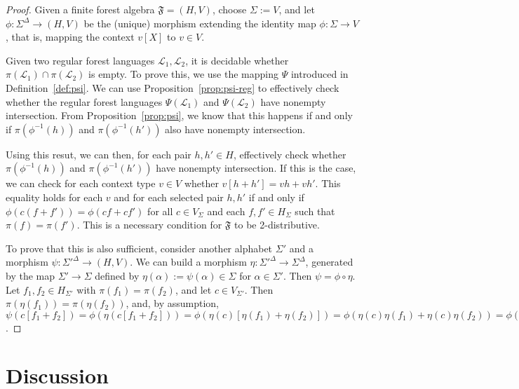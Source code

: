 \documentclass[sigplan,9pt]{acmart}\settopmatter{printfolios=true,printccs=false,printacmref=false}
\theoremstyle{definition}
\newcommand{\La}[0]{{\mathcal{L}}}
\newcommand{\Ff}[0]{{\mathfrak{F}}}
\begin{document}
\begin{proof}
Given a finite forest algebra $\Ff = (H,V)$, choose $\Sigma := V$, and let $\phi : \Sigma^\Delta \rightarrow (H,V)$ be the (unique) morphism extending the identity map $\phi : \Sigma \rightarrow V$, that is, mapping the context $v[X]$ to $v \in V$.

Given two regular forest languages $\La_1, \La_2$, it is decidable whether $\pi(\La_1) \cap \pi(\La_2)$ is empty.
To prove this, we use the mapping $\Psi$ introduced in Definition~\ref{def:psi}.
We can use Proposition~\ref{prop:psi-reg} to effectively check whether the regular forest languages $\Psi(\La_1)$ and $\Psi(\La_2)$ have nonempty intersection.
From Proposition~\ref{prop:psi}, we know that this happens if and only if $\pi(\phi^{-1}(h))$ and $\pi(\phi^{-1}(h'))$ also have nonempty intersection.

Using this resut, we can then, for each pair $h, h' \in H$, effectively check whether $\pi(\phi^{-1}(h))$ and $\pi(\phi^{-1}(h'))$ have nonempty intersection.
If this is the case, we can check for each context type $v \in V$ whether $v[h+h'] = vh+vh'$.
This equality holds for each $v$ and for each selected pair $h, h'$ if and only if $\phi(c(f+f')) = \phi(cf+cf')$ for all $c \in V_\Sigma$ and each $f, f' \in H_\Sigma$ such that $\pi(f) = \pi(f')$.
This is a necessary condition for $\Ff$ to be 2-distributive.


To prove that this is also sufficient, consider another alphabet $\Sigma'$ and a morphism $\psi : \Sigma'^\Delta \rightarrow (H,V)$.
We can build a morphism $\eta : \Sigma'^\Delta \rightarrow \Sigma^\Delta$, generated by the map $\Sigma' \rightarrow \Sigma$ defined by $\eta(\alpha) := \psi(\alpha) \in \Sigma$ for $\alpha \in \Sigma'$.
Then $\psi = \phi \circ \eta$.
Let $f_1, f_2 \in H_{\Sigma'}$ with $\pi(f_1) = \pi(f_2)$, and let $c \in V_{\Sigma'}$.
Then $\pi(\eta(f_1)) = \pi(\eta(f_2))$, and, by assumption, $\psi(c[f_1+f_2]) = \phi(\eta(c[f_1+f_2])) = \phi(\eta(c)[\eta(f_1)+\eta(f_2)]) = \phi(\eta(c)\eta(f_1)+\eta(c)\eta(f_2)) = \phi(\eta(cf_1+cf_2)) = \psi(cf_1+cf_2)$.





\end{proof}





\section{Discussion}\label{sec:discussion}
\end{document}
